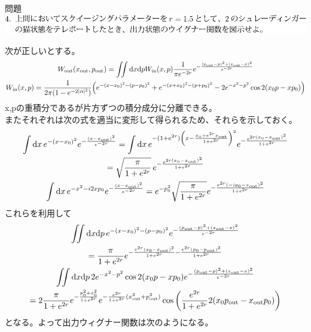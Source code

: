\documentclass{jsarticle}
\newcommand{\mr}[1]{\mathrm{#1}}
\begin{document}
\begin{itembox}[l]{問題}
	\vspace*{-0mm}
	\centering
	\includegraphics[width=1\linewidth]{./graphics/4.pdf}
\end{itembox}

次が正しいとする。
\begin{gather*}
	W_\mr{out}(x_\mr{out}, p_\mr{out}) = \iint \dd x \dd p W_\mr{in}(x,p) \frac{1}{\pi e^{-2r}} e^{- \frac{(p_\mr{out} - p)^2 + (x_\mr{out} - x)^2}{ e^{-2r}}}\\
	W_\mr{in}(x,p) = \frac{1}{2\pi (1-e^{-2|\alpha|^2})} \qty( e^{-(x-x_0)^2 - (p- p_0)^2} + e^{-(x+x_0)^2 - (p+p_0)^2} - 2e^{-x^2 - p^2} \cos{2(x_0 p - x p_0)})
\end{gather*}
x,pの重積分であるが片方ずつの積分成分に分離できる。\\
またそれぞれは次の式を適当に変形して得られるため、それらを示しておく。
\begin{gather*}
	\int \dd x \, e^{-(x-x_0)^2} e^{-\frac{(x - x_\mr{out})^2}{e^{-2r}}}
	=
	\int \dd x \, e^{-(1+e^{2r})\qty( x- \frac{x_\mr{o}+e^{2r}x_\mr{out}}{1+e^{2r}} )^2} e^{-\frac{e^{2r(x_\mr{o} - x_\mr{out})^2}}{1+e^{2r}}}\\
	= \sqrt{\frac{\pi}{1+e^{2r}}} \, e^{-\frac{e^{2r(x_\mr{o} - x_\mr{out})^2}}{1+e^{2r}}}\\
	\int \dd x \, e^{-x^2 - i2x p_0} e^{-\frac{(x-x_\mr{out})^2}{e^{-2r}}}
	=
	e^{-p_0^2} \sqrt{\frac{\pi}{1 + e^{2r}}} e^{-\frac{e^{2r}(-ip_0 - x_\mr{out})^2}{1+e^{2r}}}
\end{gather*}
これらを利用して
\begin{gather*}
	\iint \dd x \dd p \, e^{-(x-x_0)^2-(p-p_0)^2} e^{-\frac{(p_\mr{out}-p)^2+ (x_\mr{out} - x)^2}{e^{-2r}}}\\
	= \frac{\pi}{1 + e^{2r}} e^{-\frac{e^{2r}(x_0 - x_\mr{out})^2}{1+e^{2r}} -\frac{e^{2r}(p_0 - p_\mr{out})^2}{1+e^{2r}}}\\
	\iint \dd x \dd p \, 2e^{-x^2 - p^2} \cos{2(x_0 p - x p_0)} e^{-\frac{(p_\mr{out}-p)^2+ (x_\mr{out} - x)^2}{e^{-2r}}}\\
	= 2\frac{\pi}{1 + e^{2r}} e^{-\frac{p_0^2 + x_0^2}{1+e^{2r}}} e^{-\frac{e^{2r}}{1+e^{2r}}(x_\mr{out}^2 + p_\mr{out}^2)} \cos \qty( \frac{e^{2r}}{1+e^{2r}} 2(x_0 p_\mr{out} - x_\mr{out} p_0) )
\end{gather*}
となる。よって出力ウィグナー関数は次のようになる。\\
\end{document}
